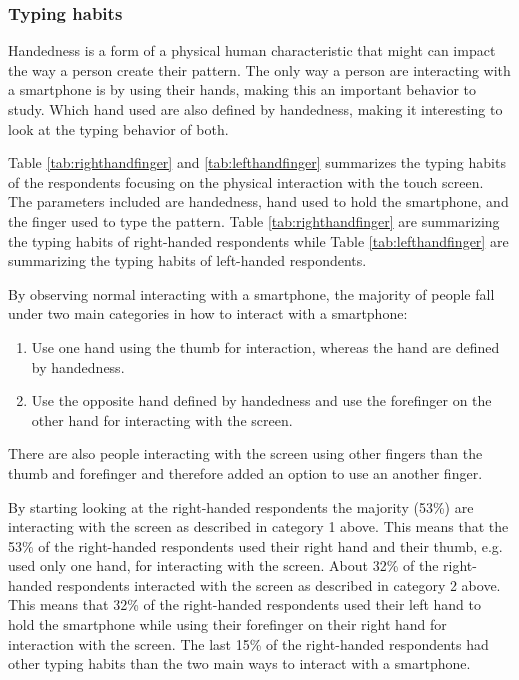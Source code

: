     \subsubsection{Typing habits}

      Handedness is a form of a physical human characteristic that might can impact the way a person create their pattern. The only way a person are interacting with a smartphone is by using their hands, making this an important behavior to study. Which hand used are also defined by handedness, making it interesting to look at the typing behavior of both. 

      Table \ref{tab:righthandfinger} and \ref{tab:lefthandfinger} summarizes the typing habits of the respondents focusing on the physical interaction with the touch screen. The parameters included are handedness, hand used to hold the smartphone, and the finger used to type the pattern. Table \ref{tab:righthandfinger} are summarizing the typing habits of right-handed respondents while Table \ref{tab:lefthandfinger} are summarizing the typing habits of left-handed respondents.

      By observing normal interacting with a smartphone, the majority of people fall under two main categories in how to interact with a smartphone:

      \begin{enumerate}
        \item Use one hand using the thumb for interaction, whereas the hand are defined by handedness.
        \item Use the opposite hand defined by handedness and use the forefinger on the other hand for interacting with the screen.
      \end{enumerate}

      There are also people interacting with the screen using other fingers than the thumb and forefinger and therefore added an option to use an another finger.

      By starting looking at the right-handed respondents the majority (53\%) are interacting with the screen as described in category 1 above. This means that the 53\% of the right-handed respondents used their right hand and their thumb, e.g. used only one hand, for interacting with the screen. About 32\% of the right-handed respondents interacted with the screen as described in category 2 above. This means that 32\% of the right-handed respondents used their left hand to hold the smartphone while using their forefinger on their right hand for interaction with the screen. The last 15\% of the right-handed respondents had other typing habits than the two main ways to interact with a smartphone.


